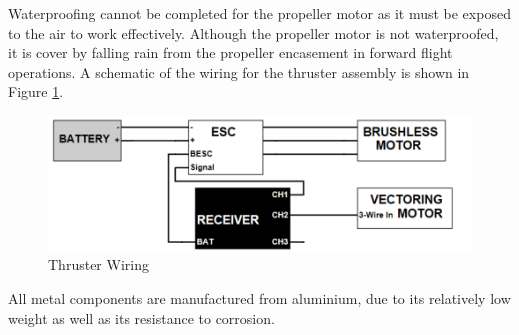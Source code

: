 \documentclass[../main.tex]{subfiles}
\begin{document}
 Waterproofing cannot be completed for the propeller motor as it must be exposed to the air to work effectively. Although the propeller motor is not waterproofed, it is cover by falling rain from the propeller encasement in forward flight operations. A schematic of the wiring for the thruster assembly is shown in Figure \ref{fig:thrusterWiringSchematic}.

\begin{figure}[H]
	\centering
	\includegraphics[width=.8\linewidth]{img/design/thruster/thrusterWiringSchematic.png}
	\caption{Thruster Wiring}
	\label{fig:thrusterWiringSchematic}
\end{figure}

All metal components are manufactured from aluminium, due to its relatively low weight as well as its resistance to corrosion.
\end{document}
